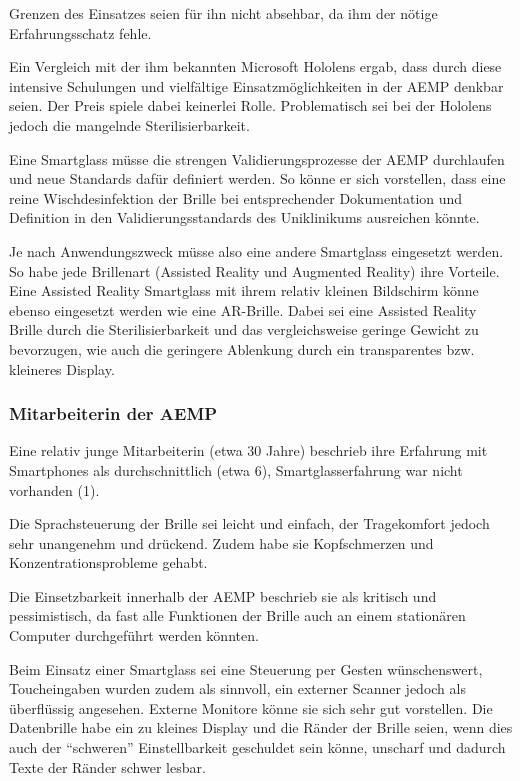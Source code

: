 Grenzen des Einsatzes seien für ihn nicht absehbar, da ihm der nötige Erfahrungsschatz fehle.

Ein Vergleich mit der ihm bekannten Microsoft Hololens ergab, dass durch diese intensive Schulungen und vielfältige Einsatzmöglichkeiten in der AEMP denkbar seien. Der Preis spiele dabei keinerlei Rolle. Problematisch sei bei der Hololens jedoch die mangelnde Sterilisierbarkeit.

Eine Smartglass müsse die strengen Validierungsprozesse der AEMP durchlaufen und neue Standards dafür definiert werden. So könne er sich vorstellen, dass eine reine Wischdesinfektion der Brille bei entsprechender Dokumentation und Definition in den Validierungsstandards des Uniklinikums ausreichen könnte.

Je nach Anwendungszweck müsse also eine andere Smartglass eingesetzt werden. So habe jede Brillenart (Assisted Reality und Augmented Reality) ihre Vorteile. Eine Assisted Reality Smartglass mit ihrem relativ kleinen Bildschirm könne ebenso eingesetzt werden wie eine AR-Brille. Dabei sei eine Assisted Reality Brille durch die Sterilisierbarkeit und das vergleichsweise geringe Gewicht zu bevorzugen, wie auch die geringere Ablenkung durch ein transparentes bzw. kleineres Display.
%
%
\subsubsection{Mitarbeiterin der AEMP}
%
Eine relativ junge Mitarbeiterin (etwa 30 Jahre) beschrieb ihre Erfahrung mit Smartphones als durchschnittlich (etwa 6), Smartglasserfahrung war nicht vorhanden (1).

Die Sprachsteuerung der Brille sei leicht und einfach, der Tragekomfort jedoch sehr unangenehm und drückend. Zudem habe sie Kopfschmerzen und Konzentrationsprobleme gehabt.

Die Einsetzbarkeit innerhalb der AEMP beschrieb sie als kritisch und pessimistisch, da fast alle Funktionen der Brille auch an einem stationären Computer durchgeführt werden könnten. 

Beim Einsatz einer Smartglass sei eine Steuerung per Gesten wünschenswert, Toucheingaben wurden zudem als sinnvoll, ein externer Scanner jedoch als überflüssig angesehen. Externe Monitore könne sie sich sehr gut vorstellen. Die Datenbrille habe ein zu kleines Display und die Ränder der Brille seien, wenn dies auch der \enquote{schweren} Einstellbarkeit geschuldet sein könne, unscharf und dadurch Texte der Ränder schwer lesbar.

